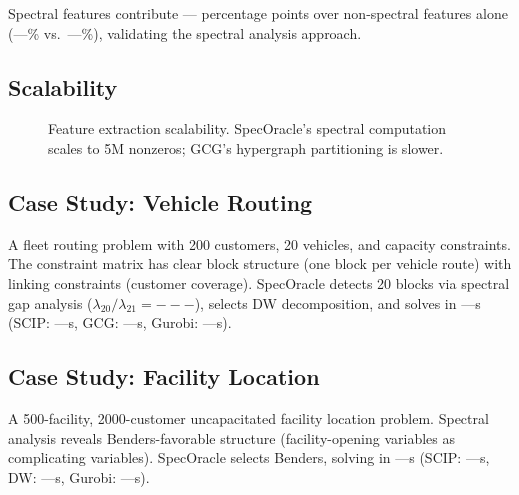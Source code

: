 \documentclass[11pt]{article}
\begin{document}
Spectral features contribute --- percentage points over non-spectral features alone (---\% vs.\ ---\%), validating the spectral analysis approach.

\subsection{Scalability}

\begin{figure}[t]
\centering
{}
\caption{Feature extraction scalability. SpecOracle's spectral computation scales to 5M nonzeros; GCG's hypergraph partitioning is slower.}
\end{figure}

\subsection{Case Study: Vehicle Routing}

A fleet routing problem with 200 customers, 20 vehicles, and capacity constraints. The constraint matrix has clear block structure (one block per vehicle route) with linking constraints (customer coverage). SpecOracle detects 20 blocks via spectral gap analysis ($\lambda_{20}/\lambda_{21} = ---$), selects DW decomposition, and solves in ---s (SCIP: ---s, GCG: ---s, Gurobi: ---s).

\subsection{Case Study: Facility Location}

A 500-facility, 2000-customer uncapacitated facility location problem. Spectral analysis reveals Benders-favorable structure (facility-opening variables as complicating variables). SpecOracle selects Benders, solving in ---s (SCIP: ---s, DW: ---s, Gurobi: ---s).
\end{document}
